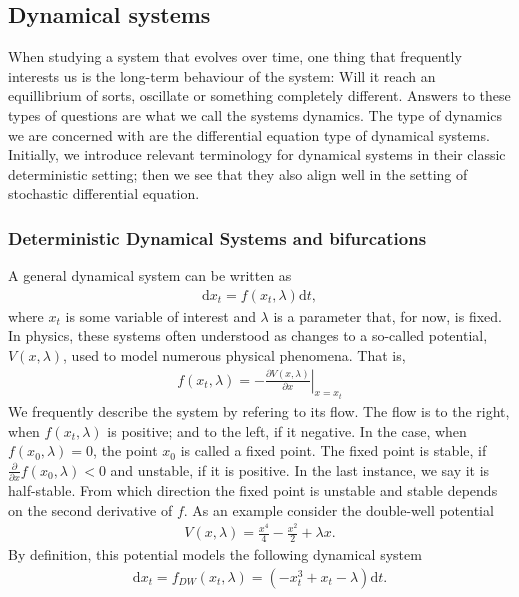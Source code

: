 \subsection{Dynamical systems}
When studying a system that evolves over time, one thing that frequently interests us is the long-term behaviour of the system: Will it reach an equillibrium of sorts, oscillate or something completely different. Answers to these types of questions are what we call the systems dynamics. The type of dynamics we are concerned with are the differential equation type of dynamical systems. Initially, we introduce relevant terminology for dynamical systems in their classic deterministic setting; then we see that they also align well in the setting of stochastic differential equation. 
\subsubsection{Deterministic Dynamical Systems and bifurcations}
A general dynamical system can be written as
\begin{align}
    \mathrm{d}x_t = f(x_t, \lambda)\mathrm{d}t, \label{eq:generalDynamicalSystem}
\end{align}
where $x_t$ is some variable of interest and $\lambda$ is a parameter that, for now, is fixed. In physics, these systems often understood as changes to a so-called potential, $V(x,\lambda)$, used to model numerous physical phenomena. That is, 
\begin{align}
     f(x_t, \lambda) = \left.-\frac{\partial V(x,\lambda)}{\partial x}\right|_{x=x_t}
\end{align}
We frequently describe the system by refering to its flow. The flow is to the right, when $f(x_t, \lambda)$ is positive; and to the left, if it negative. In the case, when $f(x_0, \lambda) = 0$, the point $x_0$ is called a fixed point. The fixed point is stable, if $\frac{\partial}{\partial x}f(x_0, \lambda) < 0$ and unstable, if it is positive. In the last instance, we say it is half-stable. From which direction the fixed point is unstable and stable depends on the second derivative of $f$.
As an example consider the double-well potential
\begin{align}
    V(x,\lambda) = \frac{x^4}{4} - \frac{x^2}{2} + \lambda x\label{eq:doubleWellPotential}.
\end{align}
By definition, this potential models the following dynamical system
\begin{align}
    \mathrm{d}x_t = f_{DW}(x_t, \lambda) = \left(-x_t^3 + x_t - \lambda \right) \mathrm{d}t \label{eq:originalDW}.
\end{align}
